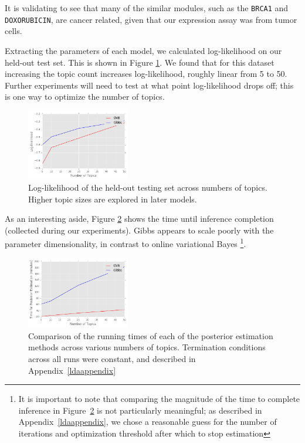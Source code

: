 \documentclass{article}
\begin{document}
It is validating to see that many of the similar modules, such as the \texttt{BRCA1} and \texttt{DOXORUBICIN}, are cancer related, given that our expression assay was from tumor cells.

Extracting the parameters of each model, we calculated log-likelihood on our held-out test set. This is shown in Figure \ref{fig:ll}. We found that for this dataset increasing the topic count increases log-likelihood, roughly linear from 5 to 50. Further experiments will need to test at what point log-likelihood drops off; this is one way to optimize the number of topics.

\begin{figure}
    \centering
    \includegraphics[width=0.4\textwidth]{figs/ll}
    \caption{Log-likelihood of the held-out testing set across numbers of topics. Higher topic sizes are explored in later models.}
    \label{fig:ll}
\vskip -0.2in
\end{figure}


As an interesting aside, Figure \ref{fig:time} shows the time until inference completion (collected during our experiments). Gibbs appears to scale poorly with the parameter dimensionality, in contrast to online variational Bayes \footnote{It is important to note that comparing the magnitude of the time to complete inference in Figure~\ref{fig:time} is not particularly meaningful; as described in Appendix~\ref{ldaappendix}, we chose a reasonable guess for the number of iterations
and optimization threshold after which to stop estimation}. 

\begin{figure}
    \centering
    \includegraphics[width=0.4\textwidth]{figs/time}
    \caption{Comparison of the running times of each of the posterior estimation methods across various numbers of topics. Termination conditions across all runs were constant, and described in Appendix~\ref{ldaappendix}}
    \label{fig:time}
\end{figure}
\end{document}
